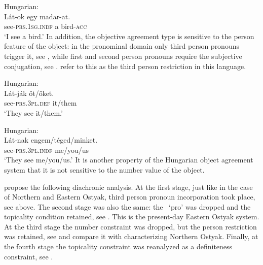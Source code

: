 \documentclass[output=paper,hidelinks]{langscibook}
\begin{document}
\ea%
    \label{ex:FinnoUgric:61}Hungarian:\\
    \gll Lát-ok egy madar-at.\\
       see-\textsc{prs.}1\textsc{sg.indf} a bird-\textsc{acc} \\
    \glt `I see a bird.'
    \z
In addition, the objective agreement type is sensitive to the person feature of the object: in the pronominal domain only third person pronouns trigger it, see , while first and second person pronouns require the subjective conjugation, see . \citet{CoppockWechsler2010} refer to this as the third person restriction in this language.

\ea%
    \label{ex:FinnoUgric:62}Hungarian:\\
    \gll Lát-ják őt/őket.\\
        see-\textsc{prs}.3\textsc{pl.def} it/them\\
    \glt `They see it/them.'
    \z

\ea%
    \label{ex:FinnoUgric:63}Hungarian:\\
    \gll Lát-nak engem/téged/minket.\\
        see-\textsc{prs.}3\textsc{pl.indf} me/you/us\\
    \glt `They see me/you/us.'
    \z
It is another property of the Hungarian object agreement system that it is not sensitive to the number value of the object.

\citet{CoppockWechsler2010} propose the following diachronic analysis. At the first stage, just like in the case of Northern and Eastern Ostyak, third person pronoun incorporation took place, see  above. The second stage was also the same: the \PRED\ `pro' was dropped and the topicality condition retained, see . This is the present-day Eastern Ostyak system. At the third stage the number constraint was dropped, but the person restriction was retained, see  and compare it with  characterizing Northern Ostyak.
\ea%
    \label{ex:FinnoUgric:64}
\z
Finally, at the fourth stage the topicality constraint was reanalyzed as a definiteness constraint, see .
\end{document}
